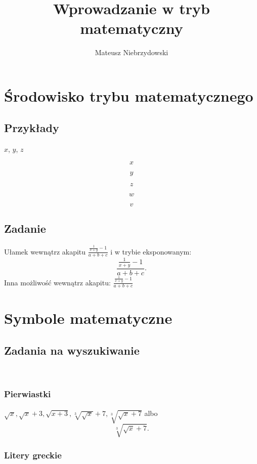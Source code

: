 \documentclass[a4paper, 12pt]{amsart}
\author[M. Niebrzydowski]{Mateusz Niebrzydowski}
\title{Wprowadzanie w tryb matematyczny}
\begin{document}
\maketitle

\section{Środowisko trybu matematycznego}
\subsection{Przykłady}

\(x\),
$y$,
\begin{math}
z
\end{math}

$$x$$

\[y\]

\begin{displaymath}
z
\end{displaymath}

\begin{equation}
w
\end{equation}

\begin{equation*}
v
\end{equation*}


\subsection{Zadanie}
Ułamek wewnątrz akapitu $\frac{\frac{1}{x+y}-1}{a+b+c}$ i w trybie eksponowanym:
$$\frac{\frac{1}{x+y}-1}{a+b+c}.$$
Inna możliwość wewnątrz akapitu: \begin{math}\frac{\frac{1}{x+y}-1}{a+b+c}\end{math}
\section{Symbole matematyczne}
\subsection{Zadania na wyszukiwanie}\
\subsubsection{Pierwiastki}

$\sqrt{x}, \sqrt{x}+3, \sqrt{x+3}, \sqrt[3]{\sqrt{x}}+7, \sqrt[3]{\sqrt{x}+7}$ albo
$$\sqrt[3]{\sqrt{x}+7}.$$

\subsubsection{Litery greckie}
\end{document}
